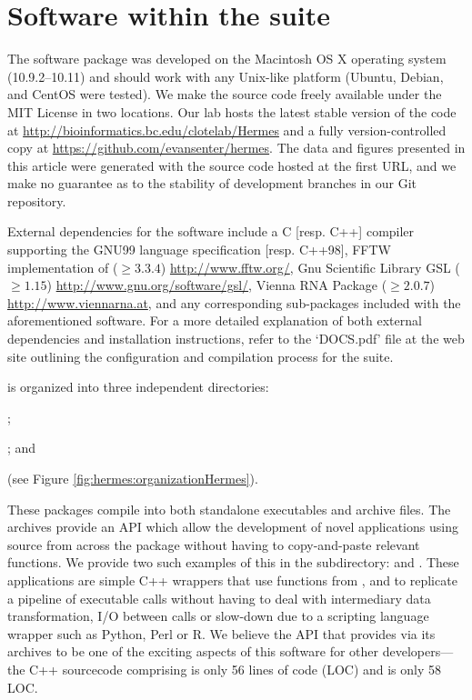 \section{Software within the \hermes suite}
\label{sec:hermes:layout}
The \hermes software package was developed on the Macintosh OS X
operating system (10.9.2--10.11) and should work with any Unix-like platform
(Ubuntu, Debian, and CentOS were tested). We make the source code freely
available under the MIT License in two locations.
Our lab hosts the latest stable version of the code at
\url{http://bioinformatics.bc.edu/clotelab/Hermes} and a fully
version-controlled copy at \url{https://github.com/evansenter/hermes}.
The data and figures presented in this article were generated with the
source code hosted at the first URL, and we make no guarantee as to
the stability of development branches in our Git repository.

External dependencies for the software include a C [resp. C++]
compiler supporting the GNU99 language specification [resp. C++98],
FFTW implementation of \fft \citep{fftw05} ($\geq
3.3.4$) \url{http://www.fftw.org/}, Gnu Scientific Library GSL ($\geq
1.15$) \url{http://www.gnu.org/software/gsl/}, Vienna RNA Package
\citep{Lorenz.amb11} ($\geq 2.0.7$) \url{http://www.viennarna.at}, and
any corresponding sub-packages included with the aforementioned
software. For a more detailed explanation of both external
dependencies and installation instructions, refer to the
`DOCS.pdf' file at the web site
outlining the configuration and compilation process for the \hermes
suite.

\hermes is organized into three independent directories:
\begin{inparaenum}[\em 1\upshape)]
\item \ffttwo; \item \rnamfpt; and \item \rnaeq (see
Figure \ref{fig:hermes:organizationHermes}).
\end{inparaenum}
These packages compile into both
standalone executables and archive files. The archives provide an
API which allow the development of novel applications using source
from across the \hermes package without having to copy-and-paste
relevant functions. We provide two such examples of this in the
 subdirectory: \fftmfpt and \ffteq. These applications
are simple C++ wrappers that use functions from \ffttwo, \rnamfpt and
\rnaeq to replicate a pipeline of executable calls without having to
deal with intermediary data transformation, I/O between calls or
slow-down due to a scripting language wrapper such as Python, Perl or R.
We believe
the API that \hermes provides via its archives to be one of the exciting
aspects of this software for other developers---the C++ sourcecode comprising
\fftmfpt is only 56 lines of code (LOC) and \ffteq is only 58 LOC.

